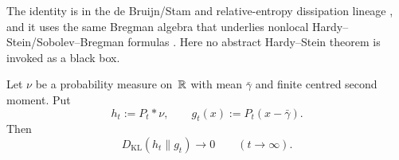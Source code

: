 The identity is in the de Bruijn/Stam and relative-entropy dissipation
lineage
\cite{DeBruijn1953,Stam1959,Blachman1965,Barron1986,
JohnsonBarron2004,MadimanBarron2007,Verdu2010Mismatched,
Yoshida2017RelativeEntropyDiffusion},
and it uses the same Bregman algebra that underlies nonlocal
Hardy--Stein/Sobolev--Bregman formulas
\cite{Bregman1967,BanuelosBogdanLuks2016HardyStein,
BanuelosKim2019HardySteinNonsymmetric,
BogdanGrzywnyPietruskaPalubaRutkowski2023NonlinearNonlocalDouglas,
Gutowski2023HardySteinPureJump,GutowskiKwasnicki2025BeurlingDenySobolevBregman,
BogdanGutowskiPietruskaPaluba2025PolarizedHardyStein}.  Here no abstract
Hardy--Stein theorem is invoked as a black box.

\begin{lemma}%
\label{lem:poisson-second-moment-kl-decay}
Let $\nu$ be a probability measure on~$\mathbb{R}$ with mean $\bar{\gamma}$ and
finite centred second moment.  Put
\[
h_t:=P_t*\nu,
\qquad
g_t(x):=P_t(x-\bar{\gamma}).
\]
Then
\[
D_{\mathrm{KL}}(h_t\|g_t)\longrightarrow0
\qquad(t\to\infty).
\]
\end{lemma}

